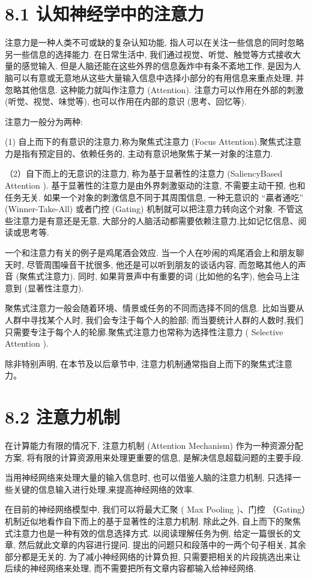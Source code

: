 \documentclass[10pt]{article}
\begin{document}
\section*{8.1 认知神经学中的注意力}
注意力是一种人类不可或缺的复杂认知功能, 指人可以在关注一些信息的同时忽略另一些信息的选择能力. 在日常生活中, 我们通过视觉、听觉、触觉等方式接收大量的感觉输入. 但是人脑还能在这些外界的信息轰炸中有条不紊地工作, 是因为人脑可以有意或无意地从这些大量输入信息中选择小部分的有用信息来重点处理, 并忽略其他信息. 这种能力就叫作注意力 (Attention). 注意力可以作用在外部的刺激 (听觉、视觉、味觉等), 也可以作用在内部的意识 (思考、回忆等).

注意力一般分为两种:

(1) 自上而下的有意识的注意力,称为聚焦式注意力 (Focus Attention).聚焦式注意力是指有预定目的、依赖任务的, 主动有意识地聚焦于某一对象的注意力.

（2）自下而上的无意识的注意力, 称为基于显著性的注意力 (SaliencyBased Attention ). 基于显著性的注意力是由外界刺激驱动的注意, 不需要主动干预, 也和任务无关. 如果一个对象的刺激信息不同于其周围信息, 一种无意识的 “贏者通吃” (Winner-Take-All) 或者门控 (Gating) 机制就可以把注意力转向这个对象. 不管这些注意力是有意还是无意, 大部分的人脑活动都需要依赖注意力,比如记忆信息、阅读或思考等.

一个和注意力有关的例子是鸡尾酒会效应. 当一个人在吵闹的鸡尾酒会上和朋友聊天时, 尽管周围噪音干扰很多, 他还是可以听到朋友的谈话内容, 而忽略其他人的声音 (聚焦式注意力). 同时, 如果背景声中有重要的词 (比如他的名字), 他会马上注意到 (显著性注意力).

聚焦式注意力一般会随着环境、情景或任务的不同而选择不同的信息. 比如当要从人群中寻找某个人时, 我们会专注于每个人的脸部; 而当要统计人群的人数时,我们只需要专注于每个人的轮廓.聚焦式注意力也常称为选择性注意力 ( Selective Attention ).

除非特别声明, 在本节及以后章节中, 注意力机制通常指自上而下的聚焦式注意力。

\section*{8.2 注意力机制}
在计算能力有限的情况下, 注意力机制 (Attention Mechanism) 作为一种资源分配方案, 将有限的计算资源用来处理更重要的信息, 是解决信息超载问题的主要手段.

当用神经网络来处理大量的输入信息时, 也可以借鉴人脑的注意力机制, 只选择一些关键的信息输入进行处理,来提高神经网络的效率.

在目前的神经网络模型中, 我们可以将最大汇聚 ( Max Pooling )、门控 （Gating）机制近似地看作自下而上的基于显著性的注意力机制. 除此之外, 自上而下的聚焦式注意力也是一种有效的信息选择方式. 以阅读理解任务为例, 给定一篇很长的文章, 然后就此文章的内容进行提问. 提出的问题只和段落中的一两个句子相关, 其余部分都是无关的. 为了减小神经网络的计算负担, 只需要把相关的片段挑选出来让后续的神经网络来处理, 而不需要把所有文章内容都输入给神经网络.
\end{document}
